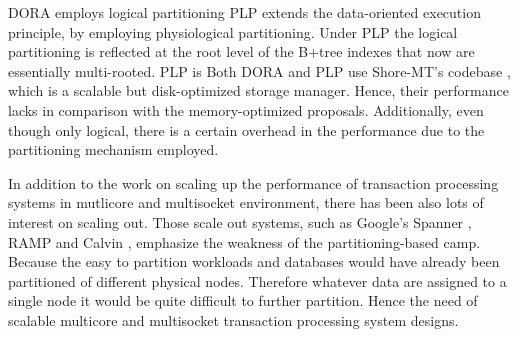 DORA \cite{PandisJHA10}  employs logical partitioning 
PLP \cite{PandisTJA11} extends the data-oriented execution principle, by employing physiological partitioning. Under PLP the logical partitioning is reflected at the root level of the B+tree indexes that now are essentially multi-rooted. PLP is
Both DORA and PLP use Shore-MT's codebase \cite{JohnsonPHAF09}, which is a scalable but disk-optimized storage manager. Hence, their performance lacks in comparison with the memory-optimized proposals. Additionally, even though only logical, there is a certain overhead in the performance due to the partitioning mechanism employed.  

In addition to the work on scaling up the performance of transaction processing systems in mutlicore and multisocket environment, there has been also lots of interest on scaling out. Those scale out systems, such as Google's Spanner \cite{Corbett+12}, RAMP \cite{BailisFHGS14} and Calvin \cite{ThomsonA10}, emphasize the weakness of the partitioning-based camp. Because the easy to partition workloads and databases would have already been partitioned of different physical nodes. Therefore whatever data are assigned to a single node it would be quite difficult to further partition.  Hence the need of scalable multicore and multisocket transaction processing system designs.
